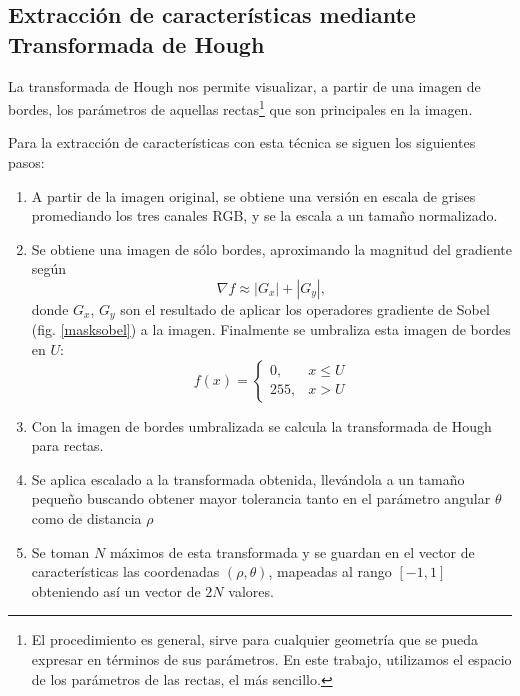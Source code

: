 \documentclass[conference,spanish,a4paper,10pt,oneside,final]{tfmpd}
\begin{document}
%
%
\subsection*{Extracción de características mediante Transformada de Hough}
La transformada de Hough nos permite visualizar, a partir de una imagen de
bordes, los parámetros de aquellas rectas\footnote{El procedimiento es general,
sirve para cualquier geometría que se pueda expresar en términos de sus
parámetros. En este trabajo, utilizamos el espacio de los parámetros de las
rectas, el más sencillo.}
que son principales en la imagen.

Para la extracción de características con esta técnica se siguen los siguientes
pasos:
\begin{enumerate}
\item A partir de la imagen original, se obtiene una versión en escala de grises
      promediando los tres canales RGB, y se la escala a un tamaño normalizado.
\item Se obtiene una imagen de sólo bordes, aproximando la magnitud del
      gradiente según
      \begin{equation}
      \label{sob}
      \nabla f \approx |G_x| + |G_y|,
      \end{equation}
      donde $G_x$, $G_y$ son el resultado de aplicar los operadores gradiente
      de Sobel (fig. \ref{masksobel}) a la imagen. 
      Finalmente se umbraliza esta imagen de bordes en $U$:
      \begin{equation}
      \label{umbral}
      f(x)=
      \begin{cases}
      0, & x\leq U\\
      255, & x > U
      \end{cases}
      \end{equation}
\item Con la imagen de bordes umbralizada se calcula la transformada de
      Hough para rectas.
\item Se aplica escalado a la transformada obtenida, llevándola a un tamaño
      pequeño buscando obtener mayor tolerancia tanto en el parámetro angular
      $\theta$ como de distancia $\rho$
\item Se toman $N$ máximos de esta transformada y se guardan en el vector de
      características las coordenadas $(\rho,\theta)$, mapeadas al rango
      $[-1,1]$ obteniendo así un vector de $2N$ valores.
\end{enumerate}
\end{document}

